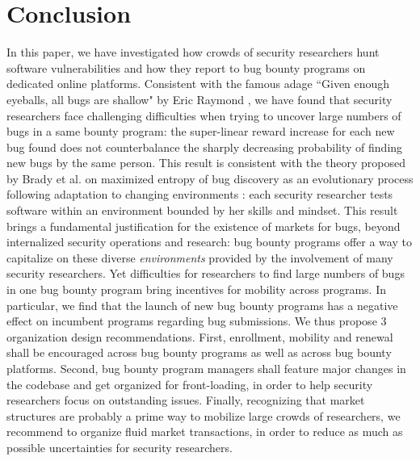 \section{Conclusion}
\label{sec:conclusion}
In this paper, we have investigated how crowds of security researchers hunt software vulnerabilities and how they report to bug bounty programs on dedicated online platforms. Consistent with the famous adage ``Given enough eyeballs, all bugs are shallow" by Eric Raymond \cite{raymond1999cathedral}, we have found that security researchers face challenging difficulties when trying to uncover large numbers of bugs in a same bounty program: the super-linear reward increase for each new bug found does not counterbalance the sharply decreasing probability of finding new bugs by the same person. This result is consistent with the theory proposed by Brady et al. on maximized entropy of bug discovery as an evolutionary process following adaptation to changing environments \cite{brady1999murphy}: each security researcher tests software within an environment bounded by her skills and mindset. This result brings a fundamental justification for the existence of markets for bugs, beyond internalized security operations and research: bug bounty programs offer a way to capitalize on these diverse {\it environments} provided by the involvement of many security researchers. Yet difficulties for researchers to find large numbers of bugs in one bug bounty program bring incentives for mobility across programs. In particular, we find that the launch of new bug bounty programs has a negative effect on incumbent programs regarding bug submissions. We thus propose 3 organization design recommendations. First, enrollment, mobility and renewal shall be encouraged across bug bounty programs as well as across bug bounty platforms. Second, bug bounty program managers shall feature major changes in the codebase and get organized for front-loading, in order to help security researchers focus on outstanding issues. Finally, recognizing that market structures are probably a prime way to mobilize large crowds of researchers, we recommend to organize fluid market transactions, in order to reduce as much as possible uncertainties for security researchers.



